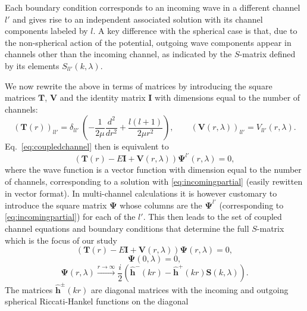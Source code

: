 \documentclass[mathpazo]{cicp}
\begin{document}
Each boundary condition corresponds to an incoming wave in a different channel $l'$ and gives rise to an independent associated solution with its channel components labeled by $l$. A key difference with the spherical case is that, due to the non-spherical action of the potential, outgoing wave components appear in channels other than the incoming channel, as indicated by the $S$-matrix defined by its elements $S_{ll'}(k, \lambda)$.

We now rewrite the above in terms of matrices by introducing the square matrices $\mathbold{T}$, $\mathbold{V}$ and the identity matrix $\mathbold{I}$ with dimensions equal to the number of channels:
\begin{equation}
	\left(\mathbold{T}(r)\right)_{ll'} =  \delta_{ll'}\: \left(-\frac{1}{2\mu} \frac{d^2}{d r^2} + \frac{l(l+1)}{2\mu r^2} \right),\qquad \left(\mathbold{V}(r,\lambda)\right)_{ll'} = V_{ll'}(r,\lambda).
\end{equation}
Eq.\ \eqref{eq:coupledchannel} then is equivalent to
\begin{equation}
	\left( \mathbold{T}(r) - E\mathbold{I} + \mathbold{V}(r, \lambda) \right) \mathbold{\Psi}^{l'}(r, \lambda) = 0,
\end{equation}
where the wave function is a vector function with dimension equal to the number of channels, corresponding to a solution with \eqref{eq:incomingpartial} (easily rewitten in vector format). In multi-channel calculations it is however customary to introduce the square matrix $\mathbold{\Psi}$ whose columns are the $\mathbold{\Psi}^{l'} $ (corresponding to \eqref{eq:incomingpartial}) for each of the $l'$. This then leads to the set of coupled channel equations and boundary conditions that determine the full $S$-matrix which is the focus of our study
\begin{equation}
	\label{eq:matrixeq}
	\left( \mathbold{T}(r) - E\mathbold{I} + \mathbold{V}(r, \lambda)  \right) \mathbold{\Psi}(r, \lambda) = 0,
\end{equation}
\begin{equation}
	\label{eq:matrixboundary1}
	\mathbold{\Psi}(0, \lambda) = 0,
\end{equation}
\begin{equation}
	\label{eq:matrixboundary2}
	\mathbold{\Psi}(r, \lambda) \xrightarrow{r\to\infty} \frac{i}{2}  \left( \hat{\mathbold{h}}^-(kr) - \hat{\mathbold{h}}^+(kr) \mathbold{S}(k,\lambda) \right).
\end{equation}
The matrices $\hat{\mathbold{h}}^{\pm}(kr)$ are diagonal matrices with the incoming and outgoing spherical Riccati-Hankel functions on the diagonal
\end{document}
